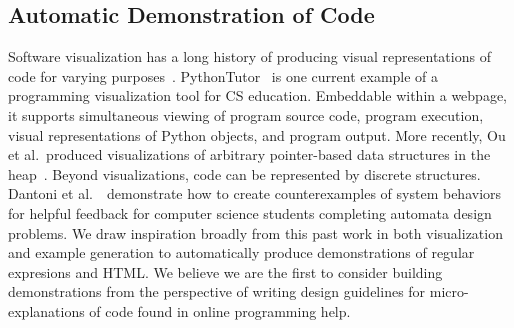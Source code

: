 \subsection{Automatic Demonstration of Code}

Software visualization has a long history of producing visual representations of code for varying purposes~\cite{sorva_visual_2012}.
PythonTutor~\cite{guo_online_2013} is one current example of a programming visualization tool for CS education.
Embeddable within a webpage, it supports simultaneous viewing of program source code, program execution, visual representations of Python objects, and program output.
More recently, Ou et al.\ produced visualizations of arbitrary pointer-based data structures in the heap~\cite{ou_interactive_2015}.
Beyond visualizations, code can be represented by discrete structures.
Dantoni et al.~\cite{dantoni_how_2015}\ demonstrate how to create counterexamples of system behaviors for helpful feedback for computer science students completing automata design problems.
We draw inspiration broadly from this past work in both visualization and example generation to automatically produce demonstrations of regular expresions and HTML\@.
We believe we are the first to consider building demonstrations from the perspective of writing design guidelines for micro-explanations of code found in online programming help.
